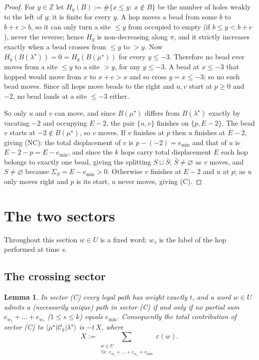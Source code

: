 \documentclass[11pt]{article}
\newtheorem{lemma}[theorem]{Lemma}
\theoremstyle{definition}
\newcommand{\Ck}{\mathcal{C}}
\newcommand{\Z}{\mathbb{Z}}
\begin{document}
\begin{proof}
For $y\in\Z$ let $H_y(B):=\#\{x\le y:\ x\notin B\}$ be the number of holes weakly to the
left of $y$; it is finite for every $y$.  A hop moves a bead from some $b$ to $b+e>b$,
so it can only turn a site $\le y$ from occupied to empty (if $b\le y<b+e$), never the
reverse; hence $H_y$ is non-decreasing along $\pi$, and it strictly increases exactly
when a bead crosses from $\le y$ to $>y$.  Now $H_y(B(\lambda^\star))=0=H_y(B(\mu^\star))$
for every $y\le-3$.  Therefore no bead ever moves from a site $\le y$ to a site $>y$,
for any $y\le-3$.  A bead at $x\le-3$ that hopped would move from $x$ to $x+e>x$ and so
cross $y=x\le-3$; so no such bead moves.  Since all hops move beads to the right and
$u,v$ start at $p\ge0$ and $-2$, no bead lands at a site $\le-3$ either.

So only $u$ and $v$ can move, and since $B(\mu^\star)$ differs from $B(\lambda^\star)$
exactly by vacating $-2$ and occupying $E-2$, the pair $\{u,v\}$ finishes on
$\{p,E-2\}$.  The bead $v$ starts at $-2\notin B(\mu^\star)$, so $v$ moves.  If $v$
finishes at $p$ then $u$ finishes at $E-2$, giving (NC): the total displacement of $v$ is
$p-(-2)=e_{\min}$ and that of $u$ is $E-2-p=E-e_{\min}$, and since the $k$ hops carry
total displacement $E$ each hop belongs to exactly one bead, giving the splitting
$S\sqcup\bar S$; $\bar S\ne\varnothing$ as $v$ moves, and $S\ne\varnothing$ because
$\Sigma_S=E-e_{\min}>0$.  Otherwise $v$ finishes at $E-2$ and $u$ at $p$; as $u$ only
moves right and $p$ is its start, $u$ never moves, giving (C).
\end{proof}

\section{The two sectors}

Throughout this section $w\in U$ is a fixed word; $w_s$ is the label of the hop
performed at time $s$.

\subsection{The crossing sector}

\begin{lemma}\label{lem:C}
In sector (C) every legal path has weight exactly $t$, and a word $w\in U$ admits a
(necessarily unique) path in sector (C) if and only if no partial sum
$e_{w_1}+\dots+e_{w_s}$ ($1\le s\le k$) equals $e_{\min}$.  Consequently the total
contribution of sector (C) to $\langle\mu^\star|\Ck_k|\lambda^\star\rangle$ is $-t\,X$,
where
\begin{equation}\label{eq:Xdef}
  X:=\sum_{\substack{w\in U\\ \exists s:\ e_{w_1}+\dots+e_{w_s}=e_{\min}}}\varepsilon(w).
\end{equation}
\end{lemma}
\end{document}
